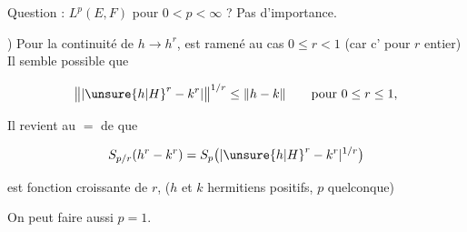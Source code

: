 Question :    $L^p(E,F)$  pour $0<p<\infty$ ? Pas d'importance.

) Pour la continuité de $h\to h^r$,  est ramené au cas $0\leq r<1$ (car c'  pour $r$ entier) Il semble possible que

\[
\bigl\|\lvert {\unsure{h|H}}^r-k^r\rvert\bigr\|^{1/r}\leq\|h-k\|\qquad\text{pour }0\leq r\leq1,
\]

Il revient au $=$ de  que

\[
S_{p/r}(h^r-k^r)=S_p\bigl(\lvert {\unsure{h|H}}^r-k^r\rvert^{1/r}\bigr)
\]

est fonction croissante de $r$, ($h$ et $k$ hermitiens positifs, $p$ quelconque)

On peut faire aussi $p=1$.
